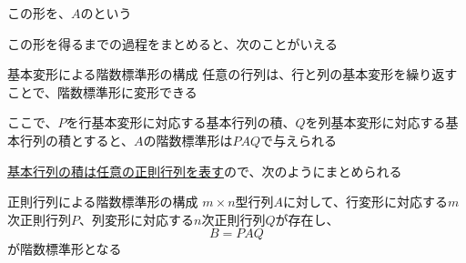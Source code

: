 \documentclass[../../../topic_linear-algebra]{subfiles}
\begin{document}
\br

この形を、$A$のという

この形を得るまでの過程をまとめると、次のことがいえる

\begin{theorem}{基本変形による階数標準形の構成}
  任意の行列は、行と列の基本変形を繰り返すことで、階数標準形に変形できる
\end{theorem}

\br

ここで、$P$を行基本変形に対応する基本行列の積、$Q$を列基本変形に対応する基本行列の積とすると、$A$の階数標準形は$PAQ$で与えられる

\br

\hyperref[thm:invertible-as-product-of-elementary]{基本行列の積は任意の正則行列を表す}ので、次のようにまとめられる

\begin{theorem}{正則行列による階数標準形の構成}
  $m \times n$型行列$A$に対して、行変形に対応する$m$次正則行列$P$、列変形に対応する$n$次正則行列$Q$が存在し、
  \begin{equation*}
    B = PAQ
  \end{equation*}
  が階数標準形となる
\end{theorem}
\end{document}
